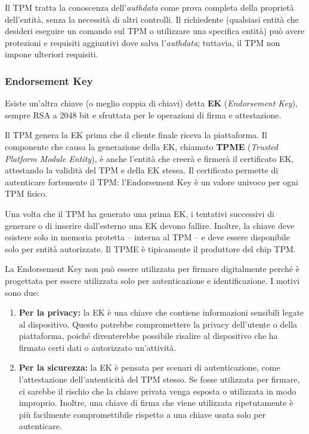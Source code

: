 Il TPM tratta la conoscenza dell'\textit{authdata} come prova completa della proprietà dell'entità, senza la necessità di altri controlli. Il richiedente (qualsiasi entità che desideri eseguire un comando sul TPM o utilizzare una specifica entità) può avere protezioni e requisiti aggiuntivi dove salva l'\textit{authdata}; tuttavia, il TPM non impone ulteriori requisiti.

\subsubsection{Endorsement Key}
Esiste un’altra chiave (o meglio coppia di chiavi) detta \textbf{EK} (\textit{Endorsement Key}), sempre RSA a 2048 bit e sfruttata per le operazioni di firma e attestazione. 

Il TPM genera la EK prima che il cliente finale riceva la piattaforma. Il componente che causa la generazione della EK, chiamato \textbf{TPME} (\textit{Trusted Platform Module Entity}), è anche l'entità che creerà e firmerà il certificato EK, attestando la validità del TPM e della EK stessa. Il certificato permette di autenticare fortemente il TPM: l'Endorsement Key è un valore univoco per ogni TPM fisico.

Una volta che il TPM ha generato una prima EK, i tentativi successivi di generare o di inserire dall’esterno una EK devono fallire. Inoltre, la chiave deve esistere solo in memoria protetta -- interna al TPM -- e deve essere disponibile solo per entità autorizzate. Il TPME è tipicamente il produttore del chip TPM.

La Endorsement Key non può essere utilizzata per firmare digitalmente perché è progettata per essere utilizzata solo per autenticazione e identificazione. I motivi sono due:
\begin{enumerate}
    \item \textbf{Per la privacy:} la EK è una chiave che contiene informazioni sensibili legate al dispositivo. Questo potrebbe compromettere la privacy dell'utente o della piattaforma, poiché diventerebbe possibile risalire al dispositivo che ha firmato certi dati o autorizzato un’attività.
    \item \textbf{Per la sicurezza:} la EK è pensata per scenari di autenticazione, come l'attestazione dell'autenticità del TPM stesso. Se fosse utilizzata per firmare, ci sarebbe il rischio che la chiave privata venga esposta o utilizzata in modo improprio. Inoltre, una chiave di firma che viene utilizzata ripetutamente è più facilmente compromettibile rispetto a una chiave usata solo per autenticare.
\end{enumerate}

